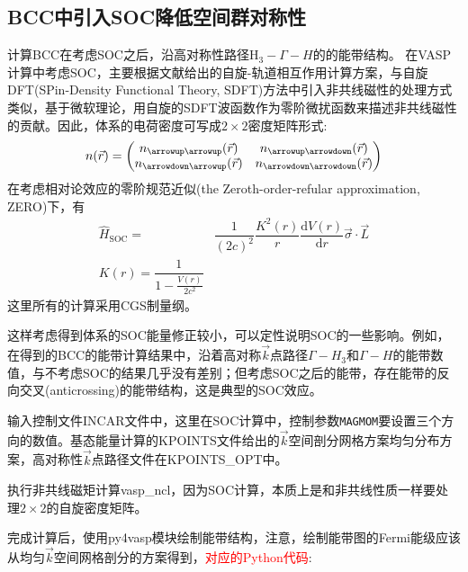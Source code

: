 \subsection{\rm{BCC}中引入\rm{SOC}降低空间群对称性}
计算\textrm{BCC}在考虑\textrm{SOC}之后，沿高对称性路径$\mathrm{H}_3-\Gamma-H$的的能带结构。
在\textrm{VASP}计算中考虑\textrm{SOC}，主要根据文献\cite{PRB62-11556_2000}给出的自旋-轨道相互作用计算方案，与自旋\textrm{DFT(SPin-Density Functional Theory, SDFT)}方法中引入非共线磁性的处理方式类似，基于微软理论，用自旋的\textrm{SDFT}波函数作为零阶微扰函数来描述非共线磁性的贡献。因此，体系的电荷密度可写成$2\times2$密度矩阵形式:
\begin{displaymath}
	n(\vec r)=
	\begin{pmatrix}
		n_{\arrowup\arrowup}(\vec r) &n_{\arrowup\arrowdown}(\vec r)\\
		n_{\arrowdown\arrowup}(\vec r) &n_{\arrowdown\arrowdown}(\vec r)
	\end{pmatrix}
\end{displaymath}
在考虑相对论效应的零阶规范近似\textrm{(the Zeroth-order-refular approximation, ZERO)}下，有
\begin{displaymath}
	\begin{aligned}
		\hat{H}_{\mathrm{SOC}}=&\dfrac1{(2c)^2}\dfrac{K^2(r)}{r}\dfrac{\mathrm{d}V(r)}{\mathrm{d}r}\vec\sigma\cdot\vec L\\
		K(r)=\dfrac1{1-\frac{V(r)}{2c^2}}
	\end{aligned}
\end{displaymath}
这里所有的计算采用\textrm{CGS}制量纲。

这样考虑得到体系的\textrm{SOC}能量修正较小，可以定性说明\textrm{SOC}的一些影响。例如，在得到的\textrm{BCC}的能带计算结果中，沿着高对称$\vec k$点路径$\Gamma-H_3$和$\Gamma-H$的能带数值，与不考虑\textrm{SOC}的结果几乎没有差别；但考虑\textrm{SOC}之后的能带，存在能带的反向交叉\textrm{(anticrossing)}的能带结构，这是典型的\textrm{SOC}效应。

输入控制文件\textrm{INCAR}文件中，这里在\textrm{SOC}计算中，控制参数\texttt{MAGMOM}要设置三个方向的数值。基态能量计算的\textrm{KPOINTS}文件给出的$\vec k$空间剖分网格方案均匀分布方案，高对称性$\vec k$点路径文件在\textrm{KPOINTS\_OPT}中。

执行非共线磁矩计算\textrm{vasp\_ncl}，因为\textrm{SOC}计算，本质上是和非共线性质一样要处理$2\times2$的自旋密度矩阵。

完成计算后，使用\textrm{py4vasp}模块绘制能带结构，注意，绘制能带图的\textrm{Fermi}能级应该从均匀$\vec k$空间网格剖分的方案得到，\textcolor{red}{对应的\textrm{Python}代码}:

